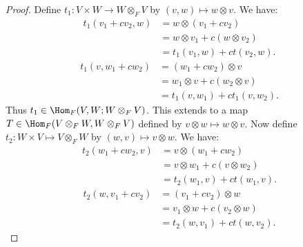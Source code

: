 \documentclass[10pt,twoside,openany]{memoir}
\begin{document}
        \begin{proof}
            Define $t_1:V \times W \rightarrow W \otimes_F V$ by $(v,w) \mapsto w \otimes v$. We have:
                \begin{equation*}
                \begin{split}
                    t_1(v_1 + cv_2,w)
                    & = w \otimes (v_1 + cv_2) \\
                    & = w \otimes v_1 + c(w \otimes v_2) \\
                    & = t_1(v_1,w) + ct(v_2,w).
                \end{split}
                \end{equation*}
                \begin{equation*}
                \begin{split}
                    t_1(v,w_1 + cw_2)
                    & = (w_1 + cw_2) \otimes v \\
                    & = w_1 \otimes v + c(w_2 \otimes v) \\
                    &= t_1(v,w_1) + ct_1(v,w_2).
                \end{split}
                \end{equation*}
            Thus $t_1 \in \Hom_F(V,W;W \otimes_F V)$. This extends to a map $T \in \Hom_F(V \otimes_F W, W \otimes_F V)$ defined by $v \otimes w \mapsto w \otimes v$. Now define $t_2:W \times V \mapsto V \otimes_F W$ by $(w,v) \mapsto v \otimes w$. We have:
                \begin{equation*}
                \begin{split}
                    t_2(w_1 + cw_2,v)
                    & = v \otimes (w_1 + cw_2) \\
                    & = v \otimes w_1 + c(v \otimes w_2) \\
                    & = t_2(w_1,v) + ct(w_1,v).
                \end{split}
                \end{equation*}
                \begin{equation*}
                \begin{split}
                    t_2(w,v_1 + cv_2)
                    & = (v_1 + cv_2) \otimes w \\
                    & = v_1 \otimes w + c(v_2 \otimes w) \\
                    & = t_2(w,v_1) + ct(w, v_2).
                \end{split}
                \end{equation*}

\end{proof}
\end{document}
